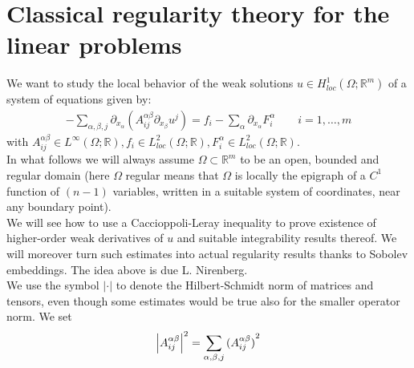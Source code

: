 \section{Classical regularity theory for the linear problems}
We want to study the local behavior of the weak solutions \(u \in H_{loc}^{1}(\Omega; \mathbb{R}^{m})\) of a system of equations given by:
\begin{gather}
	- \sum_{\alpha, \beta, j} \partial_{x_\alpha} (A_{ij}^{\alpha \beta} \partial_{x_{\beta}} u^{j}) = f_{i} - \sum_{\alpha}^{} \partial_{x_{\alpha}} F_{i}^{\alpha}\qquad i=1,\dots,m
\end{gather}
with \(A_{ij}^{\alpha \beta} \in L^{\infty}(\Omega;\mathbb{R}), f_{i}\in L^{2}_{loc}(\Omega;\mathbb{R}), F_{i}^{\alpha}\in L_{loc}^{2}(\Omega;\mathbb{R})\).\\
In what follows we will always assume \(\Omega \subset \mathbb{R}^{m}\) to be an open, bounded and regular domain (here \(\Omega \) regular means that \(\Omega \) is locally the epigraph of a \(C^{1}\) function of \((n-1)\) variables, written in a suitable system of coordinates, near any boundary point).\\
We will see how to use a Caccioppoli-Leray inequality to prove existence of higher-order weak derivatives of \(u\) and suitable integrability results thereof. We will moreover turn such estimates into actual regularity results thanks to Sobolev embeddings. The idea above is due L. Nirenberg.\\
We use the symbol \(\vert \cdot \vert \) to denote the Hilbert-Schmidt norm of matrices and tensors, even though some estimates would be true also for the smaller operator norm.
We set
\begin{gather}
	\abs{A_{ij}^{\alpha \beta}}^{2} = \sum_{\alpha, \beta, j}  {(A_{ij}^{\alpha \beta})}^{2}
\end{gather}

